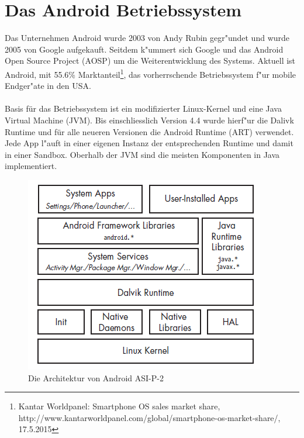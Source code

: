 
\section{Das Android Betriebssystem}
	Das Unternehmen Android wurde 2003 von Andy Rubin gegr"undet und wurde 2005 von Google aufgekauft. Seitdem k"ummert sich Google und das Android Open Source Project (AOSP) um die Weiterentwicklung des Systems. Aktuell ist Android, mit 55.6\% Marktanteil\footnote{Kantar Worldpanel: Smartphone OS sales market share, http://www.kantarworldpanel.com/global/smartphone-os-market-share/, 17.5.2015}, das vorherrschende Betriebssystem f"ur mobile Endger"ate in den USA.
	\\\\
	Basis für das Betriebssystem ist ein modifizierter Linux-Kernel und eine Java Virtual Machine (JVM). Bis einschliesslich Version 4.4 wurde hierf"ur die Dalivk Runtime und für alle neueren Versionen die Android Runtime (ART) verwendet. Jede App l"auft in einer eigenen Instanz der entsprechenden Runtime und damit in einer Sandbox.\newline
	Oberhalb der JVM sind die meisten Komponenten in Java implementiert. 
	
	\begin{figure}[h]
		\centering
		\includegraphics[width=0.7\linewidth]{android_pages/graphics/architektur_android_.png}
		\caption{Die Architektur von Android ASI-P-2}
		\label{fig:architektur_android}
	\end{figure}